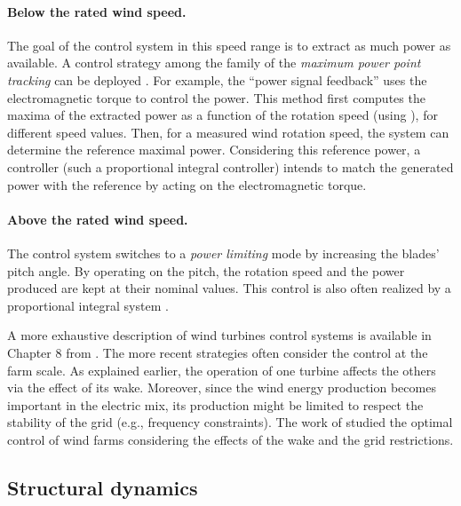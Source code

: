 \paragraph{Below the rated wind speed.}
The goal of the control system in this speed range is to extract as much power as available. 
A control strategy among the family of the \textit{maximum power point tracking} can be deployed \citep{abdullah_2012_control_review}.   
For example, the ``power signal feedback'' uses the electromagnetic torque to control the power. 
This method first computes the maxima of the extracted power as a function of the rotation speed (using ), for different speed values. 
Then, for a measured wind rotation speed, the system can determine the reference maximal power. 
Considering this reference power, a controller (such a proportional integral controller) intends to match the generated power with the reference by acting on the electromagnetic torque. 


\paragraph{Above the rated wind speed.}
The control system switches to a \textit{power limiting} mode by increasing the blades' pitch angle. 
By operating on the pitch, the rotation speed and the power produced are kept at their nominal values. 
This control is also often realized by a proportional integral system \citep{bossanyi_2003_pitch_control}. 

A more exhaustive description of wind turbines control systems is available in Chapter 8 from \citet{burton_2021_wind_handbook}. 
The more recent strategies often consider the control at the farm scale. 
As explained earlier, the operation of one turbine affects the others via the effect of its wake. 
Moreover, since the wind energy production becomes important in the electric mix, its production might be limited to respect the stability of the grid (e.g., frequency constraints).  
The work of \citet{gionfra_2018_control} studied the optimal control of wind farms considering the effects of the wake and the grid restrictions. 

\subsection{Structural dynamics}


